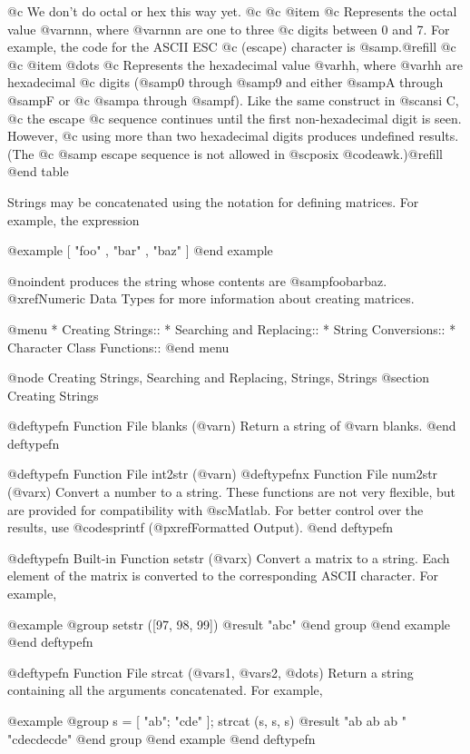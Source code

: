 {{{{@c We don't do octal or hex this way yet.
@c
@c @item 
@c Represents the octal value @var{nnn}, where @var{nnn} are one to three
@c digits between 0 and 7.  For example, the code for the ASCII ESC
@c (escape) character is @samp{}.@refill
@c 
@c @item @dots{}
@c Represents the hexadecimal value @var{hh}, where @var{hh} are hexadecimal
@c digits (@samp{0} through @samp{9} and either @samp{A} through @samp{F} or
@c @samp{a} through @samp{f}).  Like the same construct in @sc{ansi} C,
@c the escape 
@c sequence continues until the first non-hexadecimal digit is seen.  However,
@c using more than two hexadecimal digits produces undefined results.  (The
@c @samp{\x} escape sequence is not allowed in @sc{posix} @code{awk}.)@refill
@end table

Strings may be concatenated using the notation for defining matrices.
For example, the expression

@example
[ "foo" , "bar" , "baz" ]
@end example

@noindent
produces the string whose contents are @samp{foobarbaz}.  @xref{Numeric
Data Types} for more information about creating matrices.

@menu
* Creating Strings::            
* Searching and Replacing::     
* String Conversions::          
* Character Class Functions::   
@end menu

@node Creating Strings, Searching and Replacing, Strings, Strings
@section Creating Strings

@deftypefn {Function File} {} blanks (@var{n})
Return a string of @var{n} blanks.
@end deftypefn

@deftypefn {Function File} {} int2str (@var{n})
@deftypefnx {Function File} {} num2str (@var{x})
Convert a number to a string.  These functions are not very flexible,
but are provided for compatibility with @sc{Matlab}.  For better control
over the results, use @code{sprintf} (@pxref{Formatted Output}).
@end deftypefn

@deftypefn {Built-in Function} {} setstr (@var{x})
Convert a matrix to a string.  Each element of the matrix is converted
to the corresponding ASCII 
character.  For example,

@example
@group
setstr ([97, 98, 99])
     @result{} "abc"
@end group
@end example
@end deftypefn

@deftypefn {Function File} {} strcat (@var{s1}, @var{s2}, @dots{})
Return a string containing all the arguments concatenated.  For example,

@example
@group
s = [ "ab"; "cde" ];
strcat (s, s, s)
     @result{} "ab ab ab "
        "cdecdecde"
@end group
@end example
@end deftypefn

}}}}
